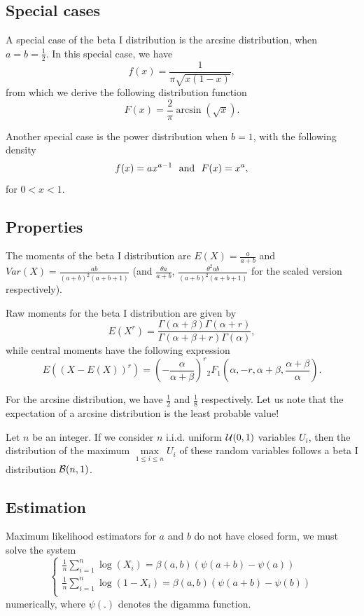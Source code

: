\subsection{Special cases}

A special case of the beta I distribution is the arcsine distribution, when $a=b=\frac{1}{2}$. In this special case, we have
$$
f(x) = \frac{1}{\pi\sqrt{x(1-x)}},
$$
from which we derive the following distribution function
$$
F(x) = \frac{2}{\pi} \arcsin(\sqrt{x}).
$$

Another special case is the power distribution when $b=1$, with the following density
$$
f(x) = a x^{a-1}
\textrm{~~and~~}
F(x) = x^a,
$$
for $0<x<1$.

\subsection{Properties}
The moments of the beta I distribution are $E(X) = \frac{a}{a+b}$ and $Var(X)=\frac{ab}{(a+b)^2(a+b+1)}$ (and $\frac{\theta a}{a+b}$, $\frac{\theta^2ab}{(a+b)^2(a+b+1)}$ for the scaled version respectively).

Raw moments for the beta I distribution are given by
$$
E(X^r) = \frac{\Gamma(\alpha+\beta)\Gamma(\alpha+r)}{\Gamma(\alpha+\beta+r)\Gamma(\alpha)},
$$
while central moments have the following expression
$$
E\left((X-E(X))^r\right) = \left(-\frac{\alpha}{\alpha+\beta}\right)^r {}_2F_1 \left(\alpha, -r, \alpha+\beta,\frac{\alpha+\beta}{\alpha}\right).
$$

For the arcsine distribution, we have $\frac{1}{2}$ and $\frac{1}{8}$ respectively. Let us note that the expectation of a arcsine distribution is the least probable value!

Let $n$ be an integer. If we consider $n$ i.i.d. uniform $\mathcal U(0,1)$ variables $U_i$, then the distribution of the maximum $\underset{1\leq i\leq n}{\max} U_i$ of these random variables follows a beta I distribution $\mathcal B(n,1)$.



\subsection{Estimation}
Maximum likelihood estimators for $a$ and $b$ do not have closed form, we must solve the system
$$
\left\{
\begin{array}{l}
\frac{1}{n}\sum\limits_{i=1}^n\log(X_i) = \beta(a,b) (\psi(a+b)-\psi(a)) \\
\frac{1}{n}\sum\limits_{i=1}^n\log(1-X_i) = \beta(a,b) (\psi(a+b)-\psi(b)) \\
\end{array}
\right.
$$
numerically, where $\psi(.)$ denotes the digamma function.

